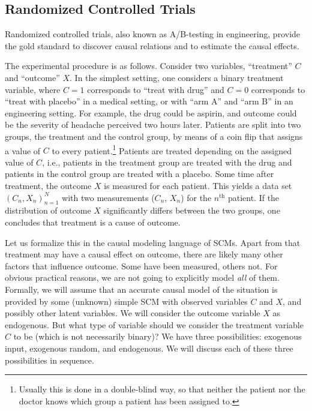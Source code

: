 \subsection{Randomized Controlled Trials}

Randomized controlled trials, also known as A/B-testing in engineering, provide the 
gold standard to discover causal relations and to estimate the causal effects.

The experimental procedure is as follows.
Consider two variables, ``treatment'' $C$ and ``outcome'' $X$. 
In the simplest setting, one considers a 
binary treatment variable, where $C=1$ corresponds to ``treat with drug'' and
$C=0$ corresponds to ``treat with placebo'' in a medical setting, or with ``arm A''
and ``arm B'' in an engineering setting. For example, the drug could be aspirin,
and outcome could be the severity of headache perceived two
hours later. Patients are split into two groups,
the treatment and the control group, by means of a coin flip that assigns a value
of $C$ to every patient.\footnote{Usually this is done in a double-blind way, so
that neither the patient nor the doctor knows which group a patient has been assigned
to.} Patients are treated depending on the assigned value of $C$, i.e., patients in the
treatment group are treated with the drug and patients in the control group are treated
with a placebo. Some time after treatment, the outcome $X$ is measured for each patient. 
This yields a data set $(C_n,X_n)_{n=1}^N$
with two measurements ($C_n$, $X_n$) for the $n^{\mathrm{th}}$ patient. 
If the distribution of outcome $X$ significantly differs between the two groups,
one concludes that treatment is a cause of outcome. 

Let us formalize this in the causal modeling language of SCMs.
Apart from that treatment may have a causal 
effect on outcome, there are likely many other factors that influence outcome. Some
have been measured, others not. For obvious practical reasons, we are not going 
to explicitly model \emph{all} of them. Formally, we will assume that an accurate
causal model of the situation is provided by some (unknown) simple SCM with observed
variables $C$ and $X$, and possibly other latent variables.
We will consider the outcome variable $X$ as endogenous. 
But what type of variable should we consider
the treatment variable $C$ to be (which is not necessarily binary)?
We have three possibilities: exogenous input, exogenous random, and endogenous. We will
discuss each of these three possibilities in sequence.

